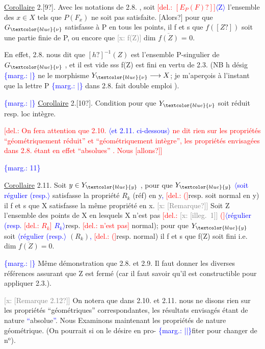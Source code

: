 \documentclass[11pt]{article}
\newcommand{\scanpage}[1]{\par\bigskip\noindent{\small\sffamily[scan #1]}\par}
\newcommand{\mspage}[1]{{\small\sffamily[p.\,#1]}}
\newcommand{\hand}[1]{\textcolor{blue}{#1}}
\newcommand{\inserted}[2][]{\textcolor{blue}{$\langle$#2$\rangle$}}
\newcommand{\margin}[1]{\textcolor{blue}{\{\textsf{marg.:} #1\}}}
\newcommand{\deleted}[1]{\textcolor{red}{[\textsf{del.:} #1]}}
\newcommand{\xout}[1]{\textcolor{gray}{[\textsf{x:} #1]}}
\newcommand{\uline}[1]{\underline{#1}}
\newcommand{\unsure}[1]{[#1?]}
\newcommand{\illegible}[1]{[\textsf{illeg.\ #1}]}
\begin{document}
\uline{Corollaire} 2.\unsure{9}.  Avec les notations de 2.8. , soit \deleted{$\unsure{E_P(F)}$}\inserted{Z} l'ensemble
des $x\in X$ tels que $P(F_x)$ ne soit pas satisfaite. \unsure{Alors} pour que
$G_{\hand{\nu}}$ satisfasse à P en tous les points, il f et s que $f(\unsure{Z})$ soit une
partie finie de P, ou encore que \xout{f(Z)} dim $\overline{f(Z)}$ = 0.

En effet, 2.8. nous dit que $\unsure{h}^{-1}(Z)$ est l'ensemble P-singulier
de $G_{\hand{\nu}}$ , et il est vide sss f(Z) est fini en vertu de 2.3. (NB h désig
\margin{|} ne le morphisme $Y_{\hand{\nu}}\longrightarrow X$; je m'aperçois à l'instant que la lettre P
\margin{|} dans 2.8. fait double emploi ).

\margin{|} \uline{Corollaire} 2.\unsure{10}.  Condition pour que $Y_{\hand{\nu}}$ soit réduit resp. loc intègre.

\deleted{On fera attention que 2.10. \inserted[typed]{et 2.11. ci-dessous} ne dit rien sur les propriétés
``géométriquement réduit'' et ``géométriquement intègre'', les propriétés
envisagées dans 2.8. étant en effet ``absolues'' . Nous \unsure{allons}}

\margin{11}

\clearpage
\scanpage{25/12}
\mspage{\hand{9}}

\uline{Corollaire} 2.11. Soit $y\in Y_{\hand{y}}$ , pour que $Y_{\hand{y}}$ \inserted{soit régulier (resp.} satisfasse la propriété
$R_k$ (réf) en y\hand{,} \deleted{(}resp. soit normal en y) il f et s que X satisfasse
la même propriété en x. \xout{\unsure{Remarque}} Soit Z l'ensemble des points de X en
lesquels X n'est pas \deleted{\xout{\illegible{1}} (}\inserted{régulier (resp. \deleted{$R_k$} $R_k$}resp. \deleted{n'est pas} normal); pour que $Y_{\hand{y}}$ soit
\inserted{régulier (resp.} $(R_k)$\hand{,} \deleted{(}resp. normal) il f et s que f(Z) soit fini i.e. dim $\overline{f(Z)}=0$.

\margin{|} Même démonstration que 2.8. et 2.9. Il faut donner les diverses
références assurant que Z est fermé (car il faut savoir qu'il est
constructible pour appliquer 2.3.).

\xout{\unsure{Remarque 2.12}} On notera que dans 2.10. et 2.11. nous ne disons rien
sur les propriétés ``géométriques'' correspondantes, les résultats
envisagés étant de nature \hand{``}absolue\hand{''}. Nous Examinons maintenant les
propriétés de nature géométrique. (On pourrait si on le désire en pro-%
\margin{||}fiter pour changer de n$^{\text{o}}$).
\end{document}
